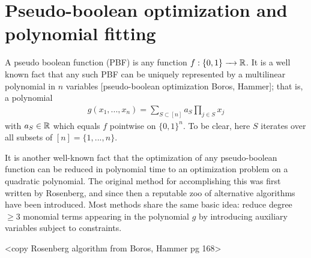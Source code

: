 \documentclass{article}
\begin{document}
\section{Pseudo-boolean optimization and polynomial fitting}
A pseudo boolean function (PBF) is any function $f:\{0,1\}\to \bR$. It is a well known fact that any such PBF can be uniquely represented by a multilinear polynomial in $n$ variables [pseudo-boolean optimization Boros, Hammer]; that is, a polynomial
\begin{align*}
  g(x_1,...,x_n) = \sum_{S \subset [n]} a_S \prod_{j \in S}x_j
\end{align*}
with $a_S \in \mathbb{R}$ which equals $f$ pointwise on $\{0,1\}^n$. To be clear, here $S$ iterates over all subsets of $[n] = \{1,...,n\}$.

It is another well-known fact that the optimization of any pseudo-boolean function can be reduced in polynomial time to an optimization problem on a quadratic polynomial. The original method for accomplishing this was first written by Rosenberg, and since then a reputable zoo of alternative algorithms have been introduced. Most methods share the same basic idea: reduce degree $\geq 3$ monomial terms appearing in the polynomial $g$ by introducing auxiliary variables subject to constraints.

<copy Rosenberg algorithm from Boros, Hammer pg 168>
\end{document}
